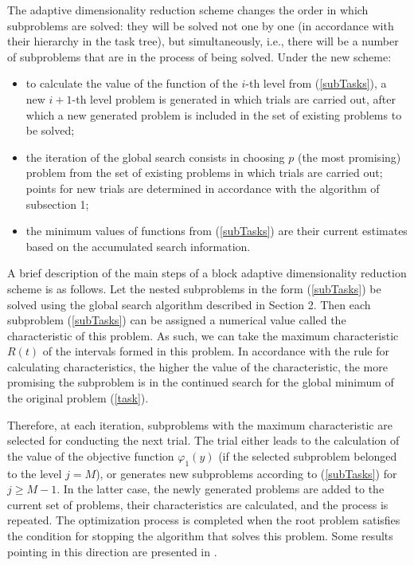 \documentclass{svproc}
\begin{document}
The adaptive dimensionality reduction scheme changes the order in which subproblems are solved: they will be solved not one by one (in accordance with their hierarchy in the task tree), but simultaneously, i.e., there will be a number of subproblems that are in the process of being solved. Under the new scheme:	
	\begin{itemize}
		\item to calculate the value of the function of the \(i\)-th level from (\ref{subTasks}), a new \(i+1\)-th level problem is generated in which trials are carried out, after which a new generated problem is included in the set of existing problems to be solved;
		\item the iteration of the global search consists in choosing \(p\) (the most promising) problem from the set of existing problems in which trials are carried out; points for new trials are determined in accordance with the algorithm of subsection 1;
		\item the minimum values of functions from (\ref{subTasks}) are their current estimates based on the accumulated search information.
	\end{itemize}
     
A brief description of the main steps of a block adaptive dimensionality reduction scheme is as follows.
Let the nested subproblems in the form (\ref{subTasks}) be solved using the global search algorithm described in Section 2. Then each subproblem (\ref{subTasks}) can be assigned a numerical value called the characteristic of this problem. As such, we can take the maximum characteristic \(R(t)\) of the intervals formed in this problem. In accordance with the rule for calculating characteristics, the higher the value of the characteristic, the more promising the subproblem is in the continued search for the global minimum of the original problem (\ref{task}). 

Therefore, at each iteration, subproblems with the maximum characteristic are selected for conducting the next trial. The trial either leads to the calculation of the value of the objective function \(\varphi_1(y)\) (if the selected subproblem belonged to the level \(j=M\)), or generates new subproblems according to (\ref{subTasks}) for \(j \geqslant  M-1\). In the latter case, the newly generated problems are added to the current set of problems, their characteristics are calculated, and the process is repeated. The optimization process is completed when the root problem satisfies the condition for stopping the algorithm that solves this problem. Some results pointing in this direction are presented in \cite{Barkalov2020}.
\end{document}
